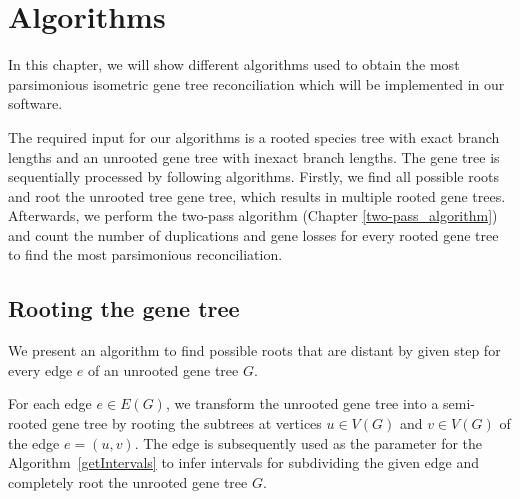 \chapter{Algorithms} \label{Algorithms}

In this chapter, we will show different algorithms used to obtain the most parsimonious isometric gene tree reconciliation which will be implemented in our software. 

The required input for our algorithms is a rooted species tree with exact branch lengths and an unrooted gene tree with inexact branch lengths. The gene tree is sequentially processed by following algorithms. Firstly, we find all possible roots and root the unrooted tree gene tree, which results in multiple rooted gene trees. Afterwards, we perform the two-pass algorithm (Chapter \ref{two-pass_algorithm}) and count the number of duplications and gene losses for every rooted gene tree to find the most parsimonious reconciliation.

\section{Rooting the gene tree} \label{rooting_the_gene_tree}

We present an algorithm to find possible roots that are distant by given step for every edge $e$ of an unrooted gene tree $G$. 

For each edge $e \in E(G)$, we transform the unrooted gene tree into a semi-rooted gene tree by rooting the subtrees at vertices $u \in V(G)$ and $v \in V(G)$ of the edge $e = (u, v)$. The edge is subsequently used as the parameter for the Algorithm~\ref{getIntervals} to infer intervals for subdividing the given edge and completely root the unrooted gene tree $G$.

